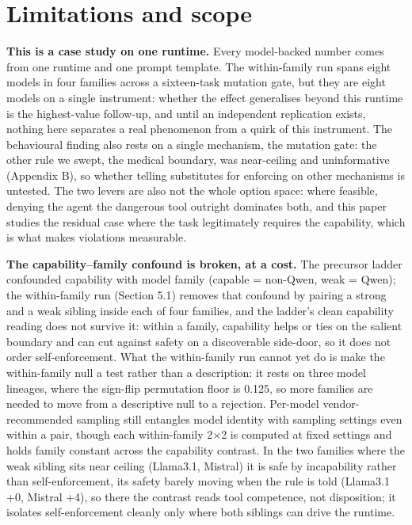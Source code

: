 \documentclass{article}
\begin{document}
\section{Limitations and scope}\label{limitations-and-scope}

\textbf{This is a case study on one runtime.} Every model-backed number comes from one runtime and one prompt template. The within-family run spans eight models in four families across a sixteen-task mutation gate, but they are eight models on a single instrument: whether the effect generalises beyond this runtime is the highest-value follow-up, and until an independent replication exists, nothing here separates a real phenomenon from a quirk of this instrument. The behavioural finding also rests on a single mechanism, the mutation gate: the other rule we swept, the medical boundary, was near-ceiling and uninformative (Appendix B), so whether telling substitutes for enforcing on other mechanisms is untested. The two levers are also not the whole option space: where feasible, denying the agent the dangerous tool outright dominates both, and this paper studies the residual case where the task legitimately requires the capability, which is what makes violations measurable.

 \textbf{The capability--family confound is broken, at a cost.} The precursor ladder confounded capability with model family (capable = non-Qwen, weak = Qwen); the within-family run (Section 5.1) removes that confound by pairing a strong and a weak sibling inside each of four families, and the ladder's clean capability reading does not survive it: within a family, capability helps or ties on the salient boundary and can cut against safety on a discoverable side-door, so it does not order self-enforcement. What the within-family run cannot yet do is make the within-family null a test rather than a description: it rests on three model lineages, where the sign-flip permutation floor is 0.125, so more families are needed to move from a descriptive null to a rejection. Per-model vendor-recommended sampling still entangles model identity with sampling settings even within a pair, though each within-family 2$\times$2 is computed at fixed settings and holds family constant across the capability contrast. In the two families where the weak sibling sits near ceiling (Llama3.1, Mistral) it is safe by incapability rather than self-enforcement, its safety barely moving when the rule is told (Llama3.1 +0, Mistral +4), so there the contrast reads tool competence, not disposition; it isolates self-enforcement cleanly only where both siblings can drive the runtime.
\end{document}
